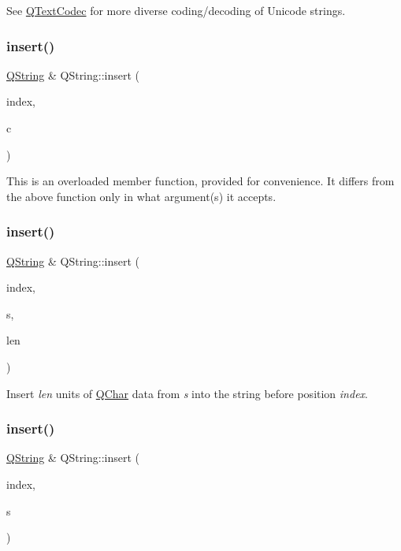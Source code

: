 See \mbox{\hyperlink{class_q_text_codec}{Q\+Text\+Codec}} for more diverse coding/decoding of Unicode strings. \mbox{\label{class_q_string_a2a54fe338baa21cba270e207f9edef97}} 
\subsubsection{\texorpdfstring{insert()}{insert()}\hspace{0.1cm}{\footnotesize\ttfamily [1/4]}}
{\footnotesize\ttfamily \mbox{\hyperlink{class_q_string}{Q\+String}} \& Q\+String\+::insert (\begin{DoxyParamCaption}\item[{uint}]{index,  }\item[{char}]{c }\end{DoxyParamCaption})\hspace{0.3cm}{\ttfamily [inline]}}

This is an overloaded member function, provided for convenience. It differs from the above function only in what argument(s) it accepts.\mbox{\label{class_q_string_aa1047c2887779c9bce2e6c09adf53432}} 
\subsubsection{\texorpdfstring{insert()}{insert()}\hspace{0.1cm}{\footnotesize\ttfamily [2/4]}}
{\footnotesize\ttfamily \mbox{\hyperlink{class_q_string}{Q\+String}} \& Q\+String\+::insert (\begin{DoxyParamCaption}\item[{uint}]{index,  }\item[{const \mbox{\hyperlink{class_q_char}{Q\+Char}} $\ast$}]{s,  }\item[{uint}]{len }\end{DoxyParamCaption})}

Insert {\itshape len} units of \mbox{\hyperlink{class_q_char}{Q\+Char}} data from {\itshape s} into the string before position {\itshape index}. \mbox{\label{class_q_string_a3733066010481ab1e8f037bd99045269}} 
\subsubsection{\texorpdfstring{insert()}{insert()}\hspace{0.1cm}{\footnotesize\ttfamily [3/4]}}
{\footnotesize\ttfamily \mbox{\hyperlink{class_q_string}{Q\+String}} \& Q\+String\+::insert (\begin{DoxyParamCaption}\item[{uint}]{index,  }\item[{const \mbox{\hyperlink{class_q_string}{Q\+String}} \&}]{s }\end{DoxyParamCaption})}

